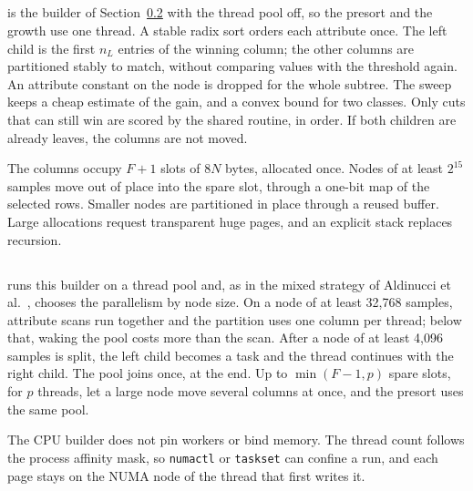 \subsection{\ImplSerialOpt}
\label{sec:impl-serial}

\ImplSerialOpt{} is the builder of Section~\ref{sec:impl-parallel} with the thread pool off, so the presort and the growth use one thread. A stable radix sort orders each attribute once. The left child is the first \(n_L\) entries of the winning column; the other columns are partitioned stably to match, without comparing values with the threshold again. An attribute constant on the node is dropped for the whole subtree. The sweep keeps a cheap estimate of the gain, and a convex bound for two classes. Only cuts that can still win are scored by the shared routine, in order. If both children are already leaves, the columns are not moved.

The columns occupy \(F+1\) slots of \(8N\) bytes, allocated once. Nodes of at least \(2^{15}\) samples move out of place into the spare slot, through a one-bit map of the selected rows. Smaller nodes are partitioned in place through a reused buffer. Large allocations request transparent huge pages, and an explicit stack replaces recursion.

\subsection{\ImplParallel}
\label{sec:impl-parallel}

\ImplParallel{} runs this builder on a thread pool and, as in the mixed strategy of Aldinucci et al.~\cite{aldinucci2014fastflow}, chooses the parallelism by node size. On a node of at least 32{,}768 samples, attribute scans run together and the partition uses one column per thread; below that, waking the pool costs more than the scan. After a node of at least 4{,}096 samples is split, the left child becomes a task and the thread continues with the right child. The pool joins once, at the end. Up to \(\min(F-1, p)\) spare slots, for \(p\) threads, let a large node move several columns at once, and the presort uses the same pool.

The CPU builder does not pin workers or bind memory. The thread count follows the process affinity mask, so \texttt{numactl} or \texttt{taskset} can confine a run, and each page stays on the NUMA node of the thread that first writes it.

\subsection{\ImplGpu}
\label{sec:impl-gpu}

